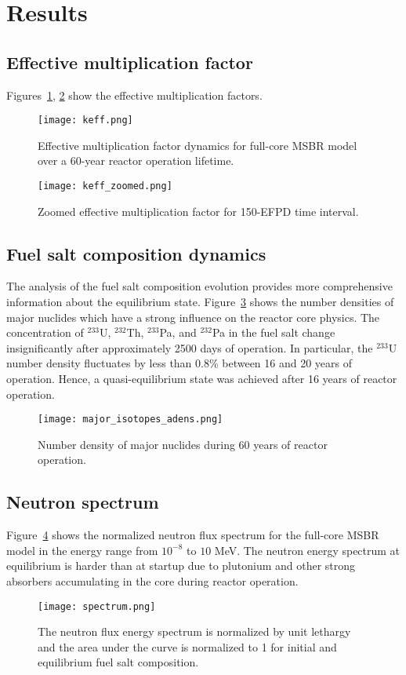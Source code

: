 \section{Results}


\subsection{Effective multiplication factor}
Figures~\ref{fig:keff}, \ref{fig:keff_zoomed} show the effective multiplication factors. 

\begin{figure}[ht!] 
  \centering
  \texttt{[image: keff.png]}
  \caption{Effective multiplication factor dynamics for full-core \gls{MSBR} 
  model over a 60-year reactor operation lifetime.}
  \label{fig:keff}
\end{figure}
\begin{figure}[ht!] 
  \centering
  \texttt{[image: keff\_zoomed.png]}
  \caption{Zoomed effective multiplication factor for 150-EFPD time interval.}
  \label{fig:keff_zoomed}
\end{figure}

\subsection{Fuel salt composition dynamics}
The analysis of the fuel salt composition evolution provides more comprehensive 
information about the equilibrium state. Figure~\ref{fig:adens_eq} shows the number 
densities of major nuclides which have a strong influence on the reactor core 
physics. The concentration of $^{233}$U, $^{232}$Th, $^{233}$Pa, and $^{232}$Pa in 
the fuel salt change insignificantly after approximately 2500 days of operation. 
In particular, the $^{233}$U number density fluctuates by less than 0.8\% between
 16 and 20 years of operation. Hence, a quasi-equilibrium state was 
achieved after 16 years of reactor operation.
\begin{figure}[ht!] %
  \centering
  \texttt{[image: major\_isotopes\_adens.png]}
  \caption{Number density of major nuclides during 60 years of reactor 
  operation.}
  \label{fig:adens_eq}
\end{figure}

\subsection{Neutron spectrum}
Figure~\ref{fig:spectrum} shows the normalized neutron flux spectrum for the 
full-core \gls{MSBR} model in the energy range from $10^{-8}$ to $10$ MeV. The 
neutron energy spectrum at equilibrium is harder than at startup due to 
plutonium and other strong absorbers accumulating in the core during reactor 
operation.  
\begin{figure}[ht!] %
  \centering
  \texttt{[image: spectrum.png]} \caption{The neutron flux energy 
  spectrum is normalized by unit lethargy and the area under the curve is normalized to 1 for initial and equilibrium fuel salt 
  composition.}
  \label{fig:spectrum}
\end{figure}

